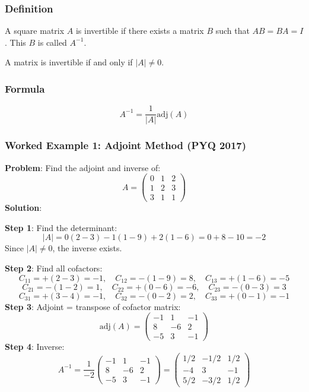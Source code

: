 \documentclass[
]{article}
\begin{document}
\subsubsection{Definition}\label{definition-14}

A square matrix \(A\) is invertible if there exists a matrix \(B\) such
that \(AB = BA = I\). This \(B\) is called \(A^{-1}\).

A matrix is invertible if and only if \(\lvert A \rvert \neq 0\).

\subsubsection{Formula}\label{formula}
\[
A^{-1} = \frac{1}{|A|} \text{adj}(A)
\]
\subsubsection{Worked Example 1: Adjoint Method (PYQ
2017)}\label{worked-example-1-adjoint-method-pyq-2017}

\textbf{Problem}: Find the adjoint and inverse of:
\[
A =
\begin{pmatrix}
0 & 1 & 2 \\
1 & 2 & 3 \\
3 & 1 & 1
\end{pmatrix}
\]
\textbf{Solution}:

\textbf{Step 1}: Find the determinant:
\[
|A| = 0(2-3) - 1(1-9) + 2(1-6) = 0 + 8 - 10 = -2
\]
Since \(\lvert A \rvert \neq 0\), the inverse exists.

\textbf{Step 2}: Find all cofactors:
\[
C_{11} = +(2-3) = -1, \quad C_{12} = -(1-9) = 8, \quad C_{13} = +(1-6) = -5
\]
\[
C_{21} = -(1-2) = 1, \quad C_{22} = +(0-6) = -6, \quad C_{23} = -(0-3) = 3
\]
\[
C_{31} = +(3-4) = -1, \quad C_{32} = -(0-2) = 2, \quad C_{33} = +(0-1) = -1
\]
\textbf{Step 3}: Adjoint = transpose of cofactor matrix:
\[
\text{adj}(A) =
\begin{pmatrix}
-1 & 1 & -1 \\
8 & -6 & 2 \\
-5 & 3 & -1
\end{pmatrix}
\]
\textbf{Step 4}: Inverse:
\[
A^{-1} = \frac{1}{-2}
\begin{pmatrix}
-1 & 1 & -1 \\
8 & -6 & 2 \\
-5 & 3 & -1
\end{pmatrix} = \begin{pmatrix} 1/2 & -1/2 & 1/2 \\ -4 & 3 & -1 \\ 5/2 & -3/2 & 1/2 \end{pmatrix}
\]
\end{document}
